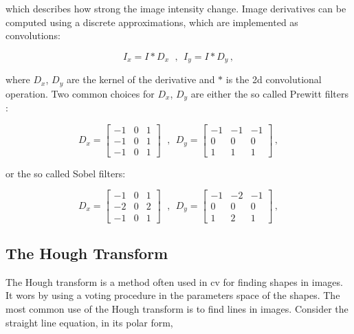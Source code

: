 which describes how strong the image intensity change. Image derivatives can be computed using a discrete approximations, which are implemented as convolutions:

\begin{equation*}
  I_x = I * D_x \ \ \,, \ \ I_y = I * D_y \,,
\end{equation*}

where $D_x$, $D_y$ are the kernel of the derivative and $*$ is the \acrshort{2d} convolutional operation. Two common choices for $D_x$, $D_y$ are either the so called Prewitt filters :

\begin{equation*}
  D_x = \begin{bmatrix}
    -1 & 0 & 1 \\
    -1 & 0 & 1 \\
    -1 & 0 & 1
  \end{bmatrix} \ \ \,,  \ \
  D_y = \begin{bmatrix}
    -1 & -1 & -1 \\
    0  & 0  & 0  \\
    1  & 1  & 1
  \end{bmatrix}\,,
\end{equation*}

or the so called Sobel filters:

\begin{equation*}
  D_x = \begin{bmatrix}
    -1 & 0 & 1 \\
    -2 & 0 & 2 \\
    -1 & 0 & 1
  \end{bmatrix} \ \ \,,  \ \
  D_y = \begin{bmatrix}
    -1 & -2 & -1 \\
    0  & 0  & 0  \\
    1  & 2  & 1
  \end{bmatrix}\,,
\end{equation*}

\subsection{The Hough Transform}\label{sec:hough}
The Hough transform is a method often used in \acrfull{cv} for finding shapes in images. It wors by using a voting procedure in the parameters space of the shapes. The most common use of the Hough transform is to find lines in images.
Consider the straight line equation, in its polar form,

